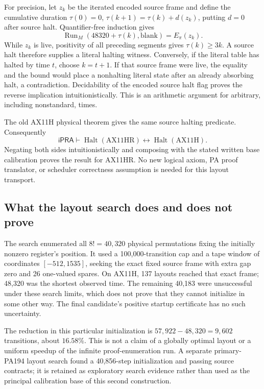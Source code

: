 \documentclass[11pt,letterpaper]{article}
\newcommand{\ipra}{\mathsf{iPRA}}
\newcommand{\Halt}{\operatorname{Halt}}
\newcommand{\Run}{\operatorname{Run}}
\begin{document}
For precision, let $z_k$ be the iterated encoded source frame and define
the cumulative duration $\tau(0)=0$,
$\tau(k+1)=\tau(k)+d(z_k)$, putting $d=0$ after source halt.
Quantifier-free induction gives
\[
 \Run_M(48320+\tau(k),\mathrm{blank})=E_\pi(z_k).
\]
While $z_k$ is live, positivity of all preceding segments gives
$\tau(k)\ge3k$. A source halt therefore supplies a literal halting
witness. Conversely, if the literal table has halted by time $t$, choose
$k=t+1$. If that source frame were live, the equality and the bound would
place a nonhalting literal state after an already absorbing halt, a
contradiction. Decidability of the encoded source halt flag proves the
reverse implication intuitionistically. This is an arithmetic argument
for arbitrary, including nonstandard, times.

The old AX11H physical theorem gives the same source halting predicate.
Consequently
\[
 \ipra\vdash\Halt(\mathrm{AX11HR})\leftrightarrow
                   \Halt(\mathrm{AX11H}).
\]
Negating both sides intuitionistically and composing with the stated
written base calibration proves the result for AX11HR. No new logical
axiom, PA proof translator, or scheduler correctness assumption is needed
for this layout transport.

\subsection{What the layout search does and does not prove}

The search enumerated all $8!=40,320$ physical permutations fixing the
initially nonzero register's position. It used a 100,000-transition cap
and a tape window of coordinates $[-512,1535]$, seeking the exact fixed
source frame with extra gap zero and 26 one-valued spares. On AX11H, 137
layouts reached that exact frame; 48,320 was the shortest observed time.
The remaining 40,183 were unsuccessful under these search limits, which
does not prove that they cannot initialize in some other way. The final
candidate's positive startup certificate has no such uncertainty.

The reduction in this particular initialization is
$57,922-48,320=9,602$ transitions, about $16.58\%$.
This is not a claim of a globally optimal layout or a uniform speedup of
the infinite proof-enumeration run. A separate primary-PA194 layout search
found a 40,856-step initialization and passing source contracts; it is
retained as exploratory search evidence rather than used as the principal
calibration base of this second construction.
\end{document}
